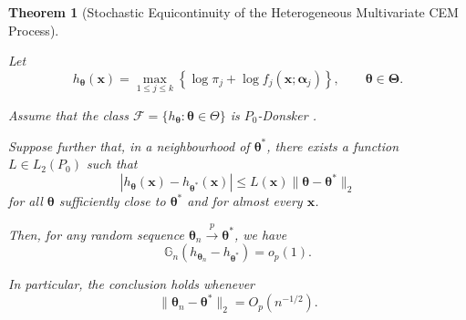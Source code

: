\documentclass[pdflatex,sn-mathphys-ay]{sn-jnl}%
\let\oldtheta\theta
\renewcommand{\theta}{\boldsymbol{\oldtheta}}
\let\oldalpha\alpha
\renewcommand{\alpha}{\boldsymbol{\oldalpha}}
\theoremstyle{thmstyleone}%
\newtheorem{theorem}{Theorem}%
\theoremstyle{thmstyletwo}%
\theoremstyle{thmstylethree}%
\begin{document}
\begin{theorem}[Stochastic Equicontinuity of the Heterogeneous Multivariate CEM Process]
\label{thm:stochastic_equicontinuity}

Let
\[
    h_{\boldsymbol{\theta}}(\mathbf{x})
    =
    \max_{1\leq j\leq k}
    \left\{
        \log \pi_j
        +
        \log f_j(\mathbf{x};\boldsymbol{\alpha}_j)
    \right\},
    \qquad
    \boldsymbol{\theta}\in\boldsymbol{\Theta}.
\]

Assume that the class
   $ \mathcal{F}
    =
    \{
        h_{\boldsymbol{\theta}}
        :
        \boldsymbol{\theta}\in\Theta
    \}$
is $ P_0$-Donsker \citep{van1996weak}.

Suppose further that, in a neighbourhood of $ \boldsymbol{\theta}^*$, there exists a function $ L\in L_2(P_0)$ such that
\[
    |h_{\boldsymbol{\theta}}(\mathbf{x})
    -
    h_{\boldsymbol{\theta}^*}(\mathbf{x})|
    \leq
    L(\mathbf{x})
    \|
        \boldsymbol{\theta}
        -
        \boldsymbol{\theta}^*
    \|_2
\]
for all $ \boldsymbol{\theta}$ sufficiently close to $ \boldsymbol{\theta}^*$
and for almost every $ \mathbf{x}$.

Then, for any random sequence
    $\boldsymbol{\theta}_n
    \xrightarrow{p}
    \boldsymbol{\theta}^*$,
we have
\[
    \mathbb{G}_n
    \left(
        h_{\boldsymbol{\theta}_n}
        -
        h_{\boldsymbol{\theta}^*}
    \right)
    =
    o_p(1).
\]

In particular, the conclusion holds whenever
\[
    \|
        \boldsymbol{\theta}_n
        -
        \boldsymbol{\theta}^*
    \|_2
    =
    O_p(n^{-1/2}).
\]

\end{theorem}
\end{document}
